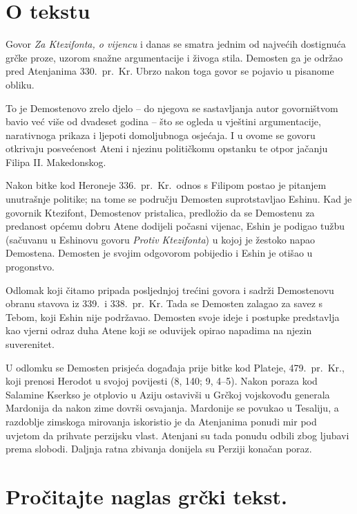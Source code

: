 
\section*{O tekstu}

Govor \textit{Za Ktezifonta, o vijencu} i danas se smatra jednim od najvećih dostignuća grčke proze, uzorom snažne argumentacije i živoga stila. Demosten ga je održao pred Atenjanima 330.\ pr.~Kr. Ubrzo nakon toga govor se pojavio u pisanome obliku.

To je Demostenovo zrelo djelo – do njegova se sastavljanja autor govorništvom bavio već više od dvadeset godina – što se ogleda u vještini argumentacije, narativnoga prikaza i ljepoti domoljubnoga osjećaja. I u ovome se govoru otkrivaju posvećenost Ateni i njezinu političkomu opstanku te otpor jačanju Filipa II. Makedonskog. 

Nakon bitke kod Heroneje 336.\ pr.~Kr.\ odnos s Filipom postao je pitanjem unutrašnje politike; na tome se području Demosten suprotstavljao Eshinu. Kad je govornik Ktezifont, Demostenov pristalica, predložio da se Demostenu za predanost općemu dobru Atene dodijeli počasni vijenac, Eshin je podigao tužbu (sačuvanu u Eshinovu govoru \textit{Protiv Ktezifonta}) u kojoj je žestoko napao Demostena. Demosten je svojim odgovorom pobijedio i Eshin je otišao u progonstvo.

Odlomak koji čitamo pripada posljednjoj trećini govora i sadrži Demostenovu obranu stavova iz 339.\ i 338.\ pr.~Kr. Tada se Demosten zalagao za savez s Tebom, koji Eshin nije podržavao. Demosten svoje ideje i postupke predstavlja kao vjerni odraz duha Atene koji se oduvijek opirao napadima na njezin suverenitet.

U odlomku se Demosten prisjeća događaja prije bitke kod Plateje, 479.\ pr.~Kr., koji prenosi Herodot u svojoj povijesti (8, 140; 9, 4–5). Nakon poraza kod Salamine Kserkso je otplovio u Aziju ostavivši u Grčkoj vojskovođu generala Mardonija da nakon zime dovrši osvajanja. Mardonije se povukao u Tesaliju, a razdoblje zimskoga mirovanja iskoristio je da Atenjanima ponudi mir pod uvjetom da prihvate perzijsku vlast. Atenjani su tada ponudu odbili zbog ljubavi prema slobodi. Daljnja ratna zbivanja donijela su Perziji konačan poraz.


\section*{Pročitajte naglas grčki tekst.}

